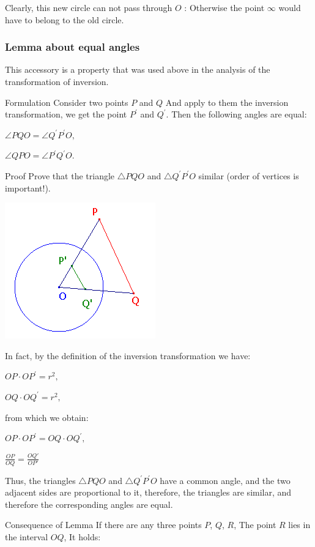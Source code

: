 Clearly, this new circle can not pass through $O$ : Otherwise the point $\infty$ would have to belong to the old circle.

\subsubsection{ Lemma about equal angles }

This accessory is a property that was used above in the analysis of the transformation of inversion.

Formulation
Consider two points $P$ and $Q$ And apply to them the inversion transformation, we get the point $P ^ \prime$ and $Q ^ \prime$. Then the following angles are equal:

$\angle PQO = \angle Q ^ \prime P ^ \prime O,$

$\angle QPO = \angle P ^ \prime Q ^ \prime O.$

Proof
Prove that the triangle $\triangle PQO$ and $\triangle Q ^ \prime P ^ \prime O$ similar (order of vertices is important!).

\includegraphics[scale=0.5]{10.png}

In fact, by the definition of the inversion transformation we have:

$OP \cdot OP ^ \prime = r ^ 2,$

$OQ \cdot OQ ^ \prime = r ^ 2,$

from which we obtain:

$OP \cdot OP ^ \prime = OQ \cdot OQ ^ \prime,$

$\frac{OP}{OQ}=\frac{OQ'}{OP'}$

Thus, the triangles $\triangle PQO$ and $\triangle Q ^ \prime P ^ \prime O$ have a common angle, and the two adjacent sides are proportional to it, therefore, the triangles are similar, and therefore the corresponding angles are equal.

Consequence of Lemma
If there are any three points $P$, $Q$, $R$, The point $R$ lies in the interval $OQ$, It holds:

